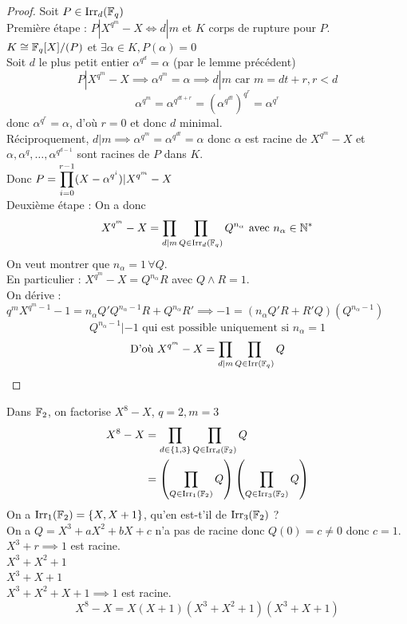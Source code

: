 \documentclass[]{report}
\begin{document}
    \begin{proof}
        Soit $P\in\text{Irr}_d(\mathbb{F}_q)$\\
        Première étape : $P|X^{q^m}-X\iff d|m$ et $K$ corps de rupture pour $P$.\\
        $K\cong\mathbb{F}_q[X]/(P)$ et $\exists\alpha \in K,P(\alpha)=0$\\
        Soit $d$ le plus petit entier \tq $\alpha^{q^d}=\alpha$ (par le lemme précédent)\\
        \[P|X^{q^m}-X\implies \alpha^{q^m}=\alpha\implies d|m \text{ car $m=dt+r,r<d$}\]
        \[\alpha^{q^m}=\alpha^{q^{dt+r}}=(\alpha^{q^{dt}})^{q^r}=\alpha^{q^r}\]
        donc $\alpha^{q^r}=\alpha$, d'où $r=0$ et donc $d$ minimal.\\
        Réciproquement, $d|m\implies \alpha^{q^m}=\alpha^{q^{dt}}=\alpha$ donc $\alpha$ est racine de $X^{q^m}-X$ et $\alpha,\alpha^q,\ldots,\alpha^{q^{d-1}}$ sont racines de $P$ dans $K$.\\
        Donc $\displaystyle{P=\prod_{i=0}^{r-1}(X-\alpha^{q^i})|X^{q^m}-X}$\\
        Deuxième étape : On a donc
        \[X^{q^m}-X=\prod_{d|m}\prod_{Q\in\text{Irr}_d(\mathbb{F}_q)}Q^{n_\alpha}\text{ avec }n_\alpha\in\mathbb{N}^*\]
        On veut montrer que $n_\alpha=1\,\forall Q$. \\
        En particulier : $X^{q^m}-X=Q^{n_\alpha}R$ avec $Q\wedge R=1$.\\
        On dérive : $q^m X^{q^m-1}-1=n_\alpha Q' Q^{n_\alpha -1}R +Q^{n_\alpha}R'\implies -1=(n_\alpha Q' R+R'Q)(Q^{n_\alpha-1})$
        \[Q^{n_\alpha-1}|-1\text{ qui est possible uniquement si $n_\alpha=1$}\]
        \[\text{D'où }X^{q^m}-X=\prod_{d|m}\prod_{Q\in\text{Irr}(\mathbb{F}_q)}Q\]
    \end{proof}

    \begin{ex}{}{}
        Dans $\mathbb{F}_2$, on factorise $X^8-X$, $q=2,m=3$\\
        \begin{align*}
            X^8-X&=\prod_{d\in\{1,3\}}\prod_{Q\in\text{Irr}_d(\mathbb{F}_2)} Q\\
            &=\left(\prod_{Q\in\text{Irr}_1(\mathbb{F}_2)}Q\right)\left(\prod_{Q\in\text{Irr}_3(\mathbb{F}_2)}Q\right)
        \end{align*}
        On a $\text{Irr}_1(\mathbb{F}_2)=\{X,X+1\}$, qu'en est-t'il de $\text{Irr}_3(\mathbb{F}_2)$ ?\\
        On a $Q=X^3+aX^2+bX+c$ n'a pas de racine donc $Q(0)=c\neq 0$ donc $c=1$.\\
        $X^3+r\implies 1$ est racine.\\
        $X^3+X^2+1$\\
        $X^3+X+1$\\
        $X^3+X^2+X+1\implies 1$ est racine.\\
        \[X^8-X=X(X+1)(X^3+X^2+1)(X^3+X+1)\]
    \end{ex}
\end{document}
